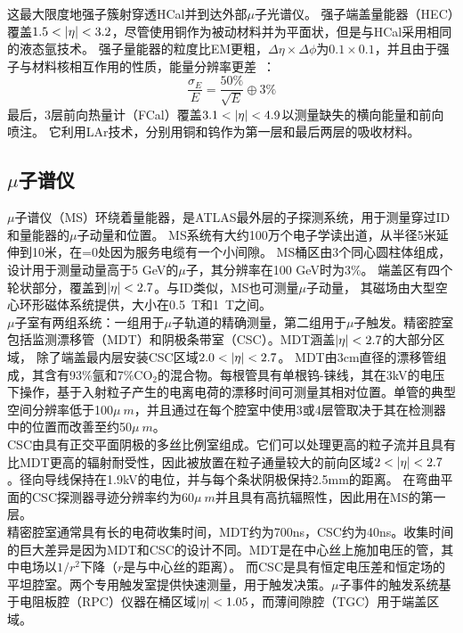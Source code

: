 这最大限度地强子簇射穿透HCal并到达外部$\mu$子光谱仪。 强子端盖量能器（HEC）覆盖$1.5<\abseta<3.2$，尽管使用铜作为被动材料并为平面状，但是与HCal采用相同的液态氩技术。 强子量能器的粒度比EM更粗，$\Delta \eta\times\Delta\phi$为$0.1\times0.1$，并且由于强子与材料核相互作用的性质，能量分辨率更差~\cite{ATLAS_Collaboration_2008}：
\begin{equation}
\frac{\sigma_{E}}{E}=\frac{50\%}{\sqrt{E}}\oplus3\%
\end{equation}
最后，3层前向热量计（FCal）覆盖$3.1<\abseta<4.9$以测量缺失的横向能量和前向喷注。 它利用LAr技术，分别用铜和钨作为第一层和最后两层的吸收材料。

\subsection{$\mu$子谱仪}
$\mu$子谱仪（MS）环绕着量能器，是ATLAS最外层的子探测系统，用于测量穿过ID和量能器的$\mu$子动量和位置。 MS系统有大约100万个电子学读出道，从半径5米延伸到10米，在\abseta =0处因为服务电缆有一个小间隙。
MS桶区由3个同心圆柱体组成，设计用于测量动量高于5 GeV的$\mu$子，其分辨率在100 GeV时为3\%。 端盖区有四个轮状部分，覆盖到$|\eta|<2.7$。与ID类似，MS也可测量$\mu$子动量，
其磁场由大型空心环形磁体系统提供，大小在0.5~T和1~T之间。\\
$\mu$子室有两组系统：一组用于$\mu$子轨道的精确测量，第二组用于$\mu$子触发。精密腔室包括监测漂移管（MDT）\cite{Bauer:2016gyg}和阴极条带室（CSC）\cite{Argyropoulos:2009zz}。MDT涵盖$|\eta|<2.7$的大部分区域，
 除了端盖最内层安装CSC区域$2.0<\abseta<2.7$。
 MDT由3cm直径的漂移管组成，其含有93\%氩和7\%CO$_{2}$的混合物。每根管具有单根钨-铼线，其在3kV的电压下操作，基于入射粒子产生的电离电荷的漂移时间可测量其相对位置。单管的典型空间分辨率低于100$\mu~m$，并且通过在每个腔室中使用3或4层管取决于其在检测器中的位置而改善至约50$\mu~m$。\\
 CSC由具有正交平面阴极的多丝比例室组成。它们可以处理更高的粒子流并且具有比MDT更高的辐射耐受性，因此被放置在粒子通量较大的前向区域$2<\abseta<2.7$。径向导线保持在1.9kV的电位，并与每个条状阴极保持2.5mm的距离。 在弯曲平面的CSC探测器寻迹分辨率约为60$\mu~m$并且具有高抗辐照性，因此用在MS的第一层。\\
 精密腔室通常具有长的电荷收集时间，MDT约为700ns，CSC约为40ns。收集时间的巨大差异是因为MDT和CSC的设计不同。MDT是在中心丝上施加电压的管，其中电场以$1/r^{2}$下降（$r$是与中心丝的距离）。
而CSC是具有恒定电压差和恒定场的平坦腔室。两个专用触发室提供快速测量，用于触发决策。$\mu$子事件的触发系统基于电阻板腔（RPC）\cite{Aielli:2006hg}仪器在桶区域$|\eta|<1.05$，而薄间隙腔（TGC）\cite{Majewski:1984ag}用于端盖区域。 
